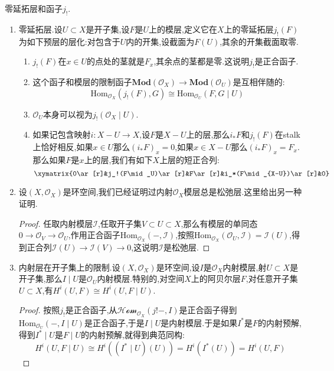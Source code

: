 零延拓层和函子$j_!$.
\begin{enumerate}
	\item 零延拓层.设$U\subset X$是开子集,设$F$是$U$上的模层,定义它在$X$上的零延拓层$j_!(F)$为如下预层的层化:对包含于$U$内的开集,设截面为$F(U)$,其余的开集截面取零.
	\begin{enumerate}
		\item $j_!(F)$在$x\in U$的点处的茎就是$F_x$,其余点的茎都是零.这说明$j_!$是正合函子.
		\item 这个函子和模层的限制函子$\textbf{Mod}(\mathscr{O}_X)\to\textbf{Mod}(\mathscr{O}_U)$是互相伴随的:
		$$\mathrm{Hom}_{\mathscr{O}_X}(j_!(F),G)\cong\mathrm{Hom}_{\mathscr{O}_U}(F,G\mid U)$$
		\item $\mathscr{O}_U$本身可以视为$j_!(\mathscr{O}_X\mid U)$.
		\item 如果记包含映射$i:X-U\to X$,设$F$是$X-U$上的层,那么$i_*F$和$j_!(F)$在stalk上恰好相反,如果$x\in U$那么$(i_*F)_x=0$,如果$x\in X-U$那么$(i_*F)_x=F_x$.那么如果$F$是$x$上的层,我们有如下$X$上层的短正合列:
		$$\xymatrix{0\ar[r]&j_!(F\mid_U)\ar[r]&F\ar[r]&i_*(F\mid_{X-U})\ar[r]&0}$$
	\end{enumerate}
	\item 设$(X,\mathscr{O}_X)$是环空间,我们已经证明过内射$\mathscr{O}_X$模层总是松弛层.这里给出另一种证明.
	\begin{proof}
		
		任取内射模层$\mathscr{I}$,任取开子集$V\subset U\subset X$,那么有模层的单同态$0\to\mathscr{O}_V\to\mathscr{O}_U$,作用正合函子$\mathrm{Hom}_{\mathscr{O}_X}(-,\mathscr{I})$,按照$\mathrm{Hom}_{\mathscr{O}_X}(\mathscr{O}_U,\mathscr{I})=\mathscr{I}(U)$,得到正合列$\mathscr{I}(U)\to\mathscr{I}(V)\to0$,这说明$\mathscr{I}$是松弛层.
	\end{proof}
	\item 内射层在开子集上的限制.设$(X,\mathscr{O}_X)$是环空间,设$I$是$\mathscr{O}_X$内射模层,射$U\subset X$是开子集,那么$I\mid U$是$\mathscr{O}_U$内射模层.特别的,对空间$X$上的阿贝尔层$F$,对任意开子集$U\subset X$,有$H^i(U,F)\cong H^i(U,F\mid U)$.
	\begin{proof}
		
		按照$j_!$是正合函子,从$\mathscr{Hom}_{\mathscr{O}_X}(j!-,I)$是正合函子得到$\mathrm{Hom}_{\mathscr{O}_U}(-,I\mid U)$是正合函子,于是$I\mid U$是内射模层.于是如果$I^*$是$F$的内射预解,得到$I^*\mid U$是$F\mid U$的内射预解,就得到典范同构:
		$$H^i(U,F\mid U)\cong H^i((I^*\mid U)(U))=H^i(I^*(U))=H^i(U,F)$$
	\end{proof}
\end{enumerate}

